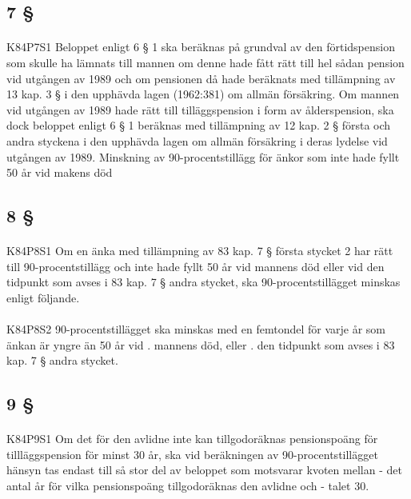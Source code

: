\documentclass[a4paper,notitlepage,openany,10pt]{book}
\begin{document}
\subsection*{7 §}
\paragraph*{}
{\tiny K84P7S1}
Beloppet enligt 6 § 1 ska beräknas på grundval av den förtidspension som skulle ha lämnats till mannen om denne hade fått rätt till hel sådan pension vid utgången av 1989 och om pensionen då hade beräknats med tillämpning av 13 kap. 3 § i den upphävda lagen (1962:381) om allmän försäkring.
Om mannen vid utgången av 1989 hade rätt till tilläggspension i form av ålderspension, ska dock beloppet enligt 6 § 1 beräknas med tillämpning av 12 kap. 2 § första och andra styckena i den upphävda lagen om allmän försäkring i deras lydelse vid utgången av 1989.
Minskning av 90-procentstillägg för änkor som inte hade fyllt 50 år vid makens död
\subsection*{8 §}
\paragraph*{}
{\tiny K84P8S1}
Om en änka med tillämpning av 83 kap. 7 § första stycket 2 har rätt till 90-procentstillägg och inte hade fyllt 50 år vid mannens död eller vid den tidpunkt som avses i 83 kap. 7 § andra stycket, ska 90-procentstillägget minskas enligt följande.
\paragraph*{}
{\tiny K84P8S2}
90-procentstillägget ska minskas med en femtondel för varje år som änkan är yngre än 50 år vid
. mannens död, eller
. den tidpunkt som avses i 83 kap. 7 § andra stycket.
\subsection*{9 §}
\paragraph*{}
{\tiny K84P9S1}
Om det för den avlidne inte kan tillgodoräknas pensionspoäng för tillläggspension för minst 30 år, ska vid beräkningen av 90-procentstillägget hänsyn tas endast till så stor del av beloppet som motsvarar kvoten mellan
\newline - det antal år för vilka pensionspoäng tillgodoräknas den avlidne och
\newline - talet 30.
\end{document}

